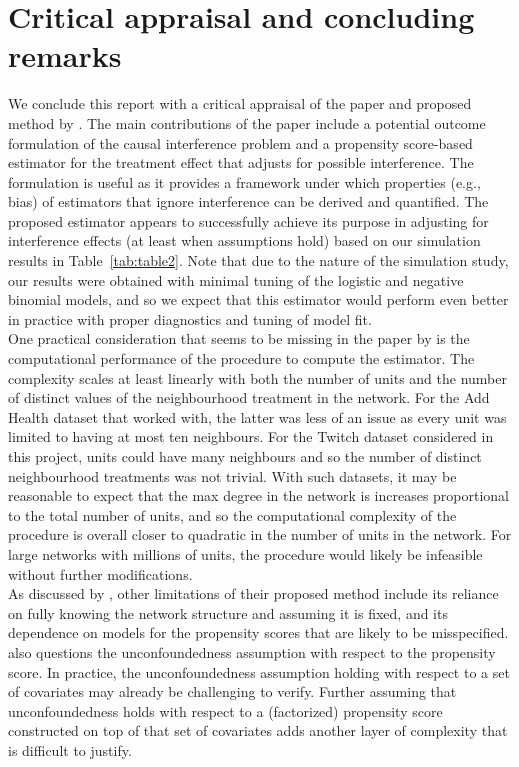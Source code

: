 \documentclass[10pt]{article}
\begin{document}
\section{Critical appraisal and concluding remarks} \label{sec:critique}

We conclude this report with a critical appraisal of the paper and proposed method by \textcite{Forastiere:2021}. The main contributions of the paper include a potential outcome formulation of the causal interference problem and a propensity score-based estimator for the treatment effect that adjusts for possible interference. The formulation is useful as it provides a framework under which properties (e.g., bias) of estimators that ignore interference can be derived and quantified. The proposed estimator appears to successfully achieve its purpose in adjusting for interference effects (at least when assumptions hold) based on our simulation results in Table~\ref{tab:table2}. Note that due to the nature of the simulation study, our results were obtained with minimal tuning of the logistic and negative binomial models, and so we expect that this estimator would perform even better in practice with proper diagnostics and tuning of model fit.
\\

One practical consideration that seems to be missing in the paper by \textcite{Forastiere:2021} is the computational performance of the procedure to compute the estimator. The complexity scales at least linearly with both the number of units and the number of distinct values of the neighbourhood treatment in the network. For the Add Health dataset that \citeauthor{Forastiere:2021} worked with, the latter was less of an issue as every unit was limited to having at most ten neighbours. For the Twitch dataset considered in this project, units could have many neighbours and so the number of distinct neighbourhood treatments was not trivial. With such datasets, it may be reasonable to expect that the max degree in the network is increases proportional to the total number of units, and so the computational complexity of the procedure is overall closer to quadratic in the number of units in the network. For large networks with millions of units, the procedure would likely be infeasible without further modifications.
\\

As discussed by \textcite{Forastiere:2021}, other limitations of their proposed method include its reliance on fully knowing the network structure and assuming it is fixed, and its dependence on models for the propensity scores that are likely to be misspecified. \textcite{Sanchez:2021} also questions the unconfoundedness assumption with respect to the propensity score. In practice, the unconfoundedness assumption holding with respect to a set of covariates may already be challenging to verify. Further assuming that unconfoundedness holds with respect to a (factorized) propensity score constructed on top of that set of covariates adds another layer of complexity that is difficult to justify.
\\
\end{document}

